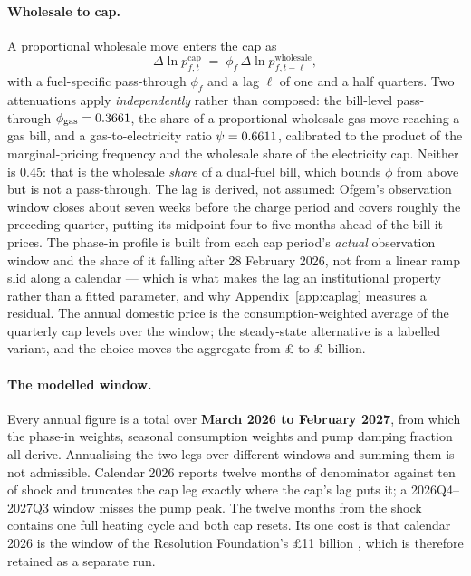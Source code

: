 \paragraph{Wholesale to cap.} A proportional wholesale move enters the cap as
\begin{equation}
\label{eq:passthrough}
\Delta \ln p^{\text{cap}}_{f,t} \;=\; \phi_f \, \Delta \ln p^{\text{wholesale}}_{f,t-\ell},
\end{equation}
with a fuel-specific pass-through $\phi_f$ and a lag $\ell$ of one and a half quarters. Two attenuations apply \emph{independently} rather than composed: the bill-level pass-through $\phi_{\text{gas}} = 0.3661{}$, the share of a proportional wholesale gas move reaching a gas bill, and a gas-to-electricity ratio $\psi = 0.6611{}$, calibrated to the product of the marginal-pricing frequency and the wholesale share of the electricity cap. Neither is 0.45: that is the wholesale \emph{share} of a dual-fuel bill, which bounds $\phi$ from above but is not a pass-through. The lag is derived, not assumed: Ofgem's observation window closes about seven weeks before the charge period and covers roughly the preceding quarter, putting its midpoint four to five months ahead of the bill it prices. The phase-in profile is built from each cap period's \emph{actual} observation window and the share of it falling after 28 February 2026, not from a linear ramp slid along a calendar --- which is what makes the lag an institutional property rather than a fitted parameter, and why Appendix~\ref{app:caplag} measures a residual. The annual domestic price is the consumption-weighted average of the quarterly cap levels over the window; the steady-state alternative is a labelled variant, and the choice moves the aggregate from \pounds \genSteadyStateAggBn{} to \pounds \genAggSpendRealisedBn{} billion.

\paragraph{The modelled window.} Every annual figure is a total over \textbf{March 2026 to February 2027}, from which the phase-in weights, seasonal consumption weights and pump damping fraction all derive. Annualising the two legs over different windows and summing them is not admissible. Calendar 2026 reports twelve months of denominator against ten of shock and truncates the cap leg exactly where the cap's lag puts it; a 2026Q4--2027Q3 window misses the pump peak. The twelve months from the shock contains one full heating cycle and both cap resets. Its one cost is that calendar 2026 is the window of the Resolution Foundation's \pounds 11 billion \citep{rf2026outlook}, which is therefore retained as a separate run.

